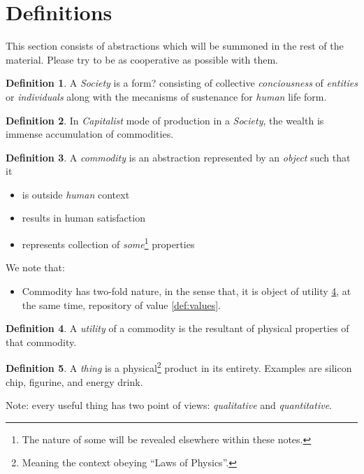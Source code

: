 \documentclass[12pt]{extarticle}
\theoremstyle{definition}
\newtheorem{definition}{Definition}[section]
\newenvironment{remark}[1][Remark]{\begin{trivlist}
\item[\hskip \labelsep {\bfseries #1}]}{\end{trivlist}}
\begin{document}
\tableofcontents

\section{Definitions}
This section consists of abstractions which will be summoned in the rest of the material.  Please try to be as cooperative as possible with them.

\begin{definition}
  A \emph{Society} is a form? consisting of collective \emph{conciousness} of \emph{entities} or \emph{individuals} along with the mecanisms of sustenance for \emph{human} life form.  
  \end{definition}

\begin{definition}
  In \emph{Capitalist} mode of production in a \emph{Society}, the wealth is immense accumulation of commodities.
\end{definition}

\begin{definition}
  \label{def:commodity}
  A \emph{commodity} is an abstraction represented by an \emph{object} such that it
  \begin{itemize}
  \item is outside \emph{human} context
  \item results in human satisfaction
  \item represents collection of \emph{some}\footnote{The nature of some will be revealed elsewhere within these notes.} properties
  \end{itemize} 
\end{definition}

\begin{remark}
  We note that:
  \begin{itemize}
  \item Commodity has two-fold nature, in the sense that, it is object of utility \ref{def:utility}, at the same time, repository of value \ref{def:values}.
  \end{itemize}
\end{remark}

\begin{definition}
  \label{def:utility}
  A \emph{utility} of a commodity is the resultant of physical properties of that commodity.
\end{definition}

\begin{definition}
 \label{def:thing}
  A \emph{thing} is a physical\footnote{Meaning the context obeying ``Laws of Physics''.} product in its entirety.  Examples are silicon chip, figurine, and energy drink.
\end{definition}
Note: every useful thing has two point of views: \emph{qualitative} and \emph{quantitative}.
\end{document}

